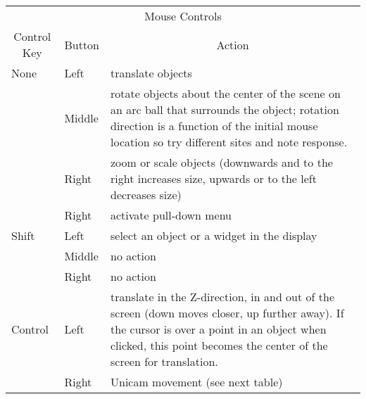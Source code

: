 \begin{center}
  \begin{tabular}{|l|l|p{3in}|} \hline
    \multicolumn{3}{|c|}{Mouse Controls}\\
    \multicolumn{1}{|c|}{Control Key} & 
    \multicolumn{1}{|c|}{Button} & 
    \multicolumn{1}{|c|}{Action}\\ \hline
None & Left & translate objects \\
     & Middle & rotate objects about the center of the scene on an arc ball
    that surrounds the object; rotation direction is a function of the
    initial mouse location so try different sites and note response. \\ 
     & Right & zoom or scale objects (downwards and to the right increases
     size, upwards or to the left decreases size) \\ 
     & Right & activate pull-down menu \\ \hline
Shift & Left & select an object or a widget in the display \\
      & Middle &  no action \\
      & Right &  no action \\ \hline
Control & Left & translate in the Z-direction, \ie{} in and out of the
    screen (down moves closer, up further away).  If the cursor is over a
    point in an object when clicked, this point becomes the center of the
    screen for translation.\\ 
      & Right & Unicam movement (see next table)\\ \hline
\end{tabular}

\bigskip


\end{center}
